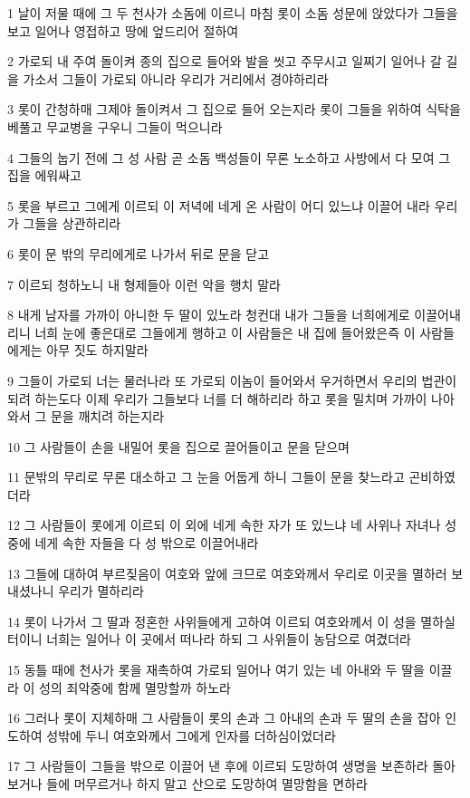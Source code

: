 \par 1 날이 저물 때에 그 두 천사가 소돔에 이르니 마침 롯이 소돔 성문에 앉았다가 그들을 보고 일어나 영접하고 땅에 엎드리어 절하여
\par 2 가로되 내 주여 돌이켜 종의 집으로 들어와 발을 씻고 주무시고 일찌기 일어나 갈 길을 가소서 그들이 가로되 아니라 우리가 거리에서 경야하리라
\par 3 롯이 간청하매 그제야 돌이켜서 그 집으로 들어 오는지라 롯이 그들을 위하여 식탁을 베풀고 무교병을 구우니 그들이 먹으니라
\par 4 그들의 눕기 전에 그 성 사람 곧 소돔 백성들이 무론 노소하고 사방에서 다 모여 그 집을 에워싸고
\par 5 롯을 부르고 그에게 이르되 이 저녁에 네게 온 사람이 어디 있느냐 이끌어 내라 우리가 그들을 상관하리라
\par 6 롯이 문 밖의 무리에게로 나가서 뒤로 문을 닫고
\par 7 이르되 청하노니 내 형제들아 이런 악을 행치 말라
\par 8 내게 남자를 가까이 아니한 두 딸이 있노라 청컨대 내가 그들을 너희에게로 이끌어내리니 너희 눈에 좋은대로 그들에게 행하고 이 사람들은 내 집에 들어왔은즉 이 사람들에게는 아무 짓도 하지말라
\par 9 그들이 가로되 너는 물러나라 또 가로되 이놈이 들어와서 우거하면서 우리의 법관이 되려 하는도다 이제 우리가 그들보다 너를 더 해하리라 하고 롯을 밀치며 가까이 나아와서 그 문을 깨치려 하는지라
\par 10 그 사람들이 손을 내밀어 롯을 집으로 끌어들이고 문을 닫으며
\par 11 문밖의 무리로 무론 대소하고 그 눈을 어둡게 하니 그들이 문을 찾느라고 곤비하였더라
\par 12 그 사람들이 롯에게 이르되 이 외에 네게 속한 자가 또 있느냐 네 사위나 자녀나 성중에 네게 속한 자들을 다 성 밖으로 이끌어내라
\par 13 그들에 대하여 부르짖음이 여호와 앞에 크므로 여호와께서 우리로 이곳을 멸하러 보내셨나니 우리가 멸하리라
\par 14 롯이 나가서 그 딸과 정혼한 사위들에게 고하여 이르되 여호와께서 이 성을 멸하실터이니 너희는 일어나 이 곳에서 떠나라 하되 그 사위들이 농담으로 여겼더라
\par 15 동틀 때에 천사가 롯을 재촉하여 가로되 일어나 여기 있는 네 아내와 두 딸을 이끌라 이 성의 죄악중에 함께 멸망할까 하노라
\par 16 그러나 롯이 지체하매 그 사람들이 롯의 손과 그 아내의 손과 두 딸의 손을 잡아 인도하여 성밖에 두니 여호와께서 그에게 인자를 더하심이었더라
\par 17 그 사람들이 그들을 밖으로 이끌어 낸 후에 이르되 도망하여 생명을 보존하라 돌아보거나 들에 머무르거나 하지 말고 산으로 도망하여 멸망함을 면하라
